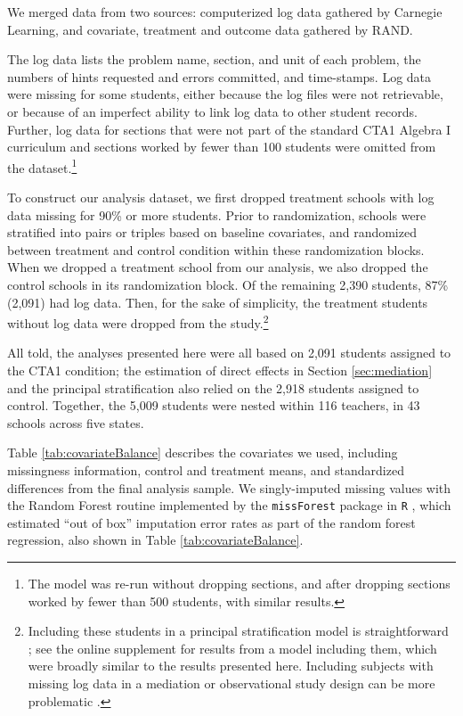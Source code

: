\documentclass{article}\usepackage[]{graphicx}\usepackage[]{color}
\begin{document}
We merged data from two sources: computerized log data gathered by
Carnegie Learning, and covariate, treatment and outcome data gathered by RAND.

The log data lists the problem name, section, and unit of
each problem, the numbers of hints requested and errors committed, and time-stamps.
Log data were missing for some students, either because the log files
were not retrievable, or because of an imperfect ability to link log
data to other student records.
Further, log data for sections that were not part of the
standard CTA1 Algebra I curriculum and sections worked by fewer than 100
students were omitted from the
dataset.\footnote{The model was re-run without dropping sections, and
  after dropping sections worked by fewer than 500 students, with
  similar results.}

To construct our analysis dataset, we first dropped treatment schools with log data missing
for 90\% or more students.
Prior to randomization, schools were stratified into pairs or triples
based on baseline covariates, and randomized between treatment and
control condition within these randomization blocks.
When we dropped a treatment school from our analysis, we also dropped
the control schools in its randomization block.
Of the remaining 2,390 students, 87\% (2,091) had log
data.
Then, for the sake of simplicity, the treatment students without log data
were dropped from the study.\footnote{Including these students in a
  principal stratification model is straightforward \citep{aoas}; see
  the online supplement for results from a model including them, which
  were broadly similar to the results presented here. Including
  subjects with missing log data in a mediation or observational study
  design can be more problematic \citep[see, e.g.][]{li2017identifiability}.}

All told, the analyses presented here were all based on 2,091 students assigned to the CTA1 condition; the estimation of direct effects in Section \ref{sec:mediation} and the principal stratification also relied on the 2,918 students assigned to control.
Together, the 5,009 students were nested within 116 teachers, in 43 schools across five states.


Table \ref{tab:covariateBalance} describes the covariates we used, including
missingness information, control and treatment means, and standardized
differences \citep[c.f.][]{kalton1968standardization} from the final
analysis sample.
We singly-imputed missing values with the Random Forest routine implemented
by the \texttt{missForest} package in \texttt{R}
\citep{missForest,rcite},  which estimated ``out of box'' imputation
error rates as part of the random forest regression, also shown in Table \ref{tab:covariateBalance}.
\end{document}
